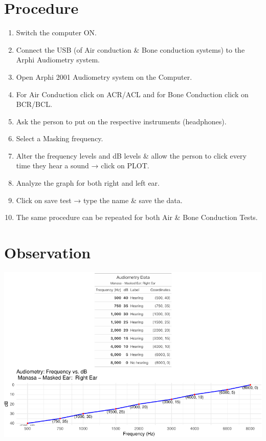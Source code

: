 \documentclass[
  11pt,
  letterpaper,
  DIV=11,
  numbers=noendperiod]{scrreprt}
\providecommand{\tightlist}{%
  \setlength{\itemsep}{0pt}\setlength{\parskip}{0pt}}\usepackage{longtable,booktabs,array}
\begin{document}
\section{Procedure}\label{procedure-5}

\begin{enumerate}
\def\labelenumi{\arabic{enumi}.}
\tightlist
\item
  Switch the computer ON.
\item
  Connect the USB (of Air conduction \& Bone conduction systems) to the
  Arphi Audiometry system.
\item
  Open Arphi 2001 Audiometry system on the Computer.
\item
  For Air Conduction click on ACR/ACL and for Bone Conduction click on
  BCR/BCL.
\item
  Ask the person to put on the respective instruments (headphones).
\item
  Select a Masking frequency.
\item
  Alter the frequency levels and dB levels \& allow the person to click
  every time they hear a sound → click on PLOT.
\item
  Analyze the graph for both right and left ear.
\item
  Click on save test → type the name \& save the data.
\item
  The same procedure can be repeated for both Air \& Bone Conduction
  Tests.
\end{enumerate}

\section{Observation}\label{observation-4}

\includegraphics{audiometry_files/figure-pdf/unnamed-chunk-1-1.pdf}
\end{document}
